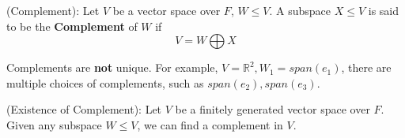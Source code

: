 \begin{definition}
(Complement): Let $V$ be a vector space over $F$, $W \leq V$. A subspace $X \leq V$ is said to be the \textbf{Complement} of $W$ if 
    \[
      V = W \bigoplus X
    \]
\end{definition} 

\begin{remark}
Complements are \textbf{not} unique. For example, $V = \mathbb{R}^2, W_1 = span(e_1)$, there are multiple choices of complements, such as $span(e_2), span(e_3)$.
\end{remark}

\begin{theorem}
(Existence of Complement): Let $V$ be a finitely generated vector space over $F$. Given any subspace $W \leq V$, we can find a complement in $V$. 
\end{theorem} 

